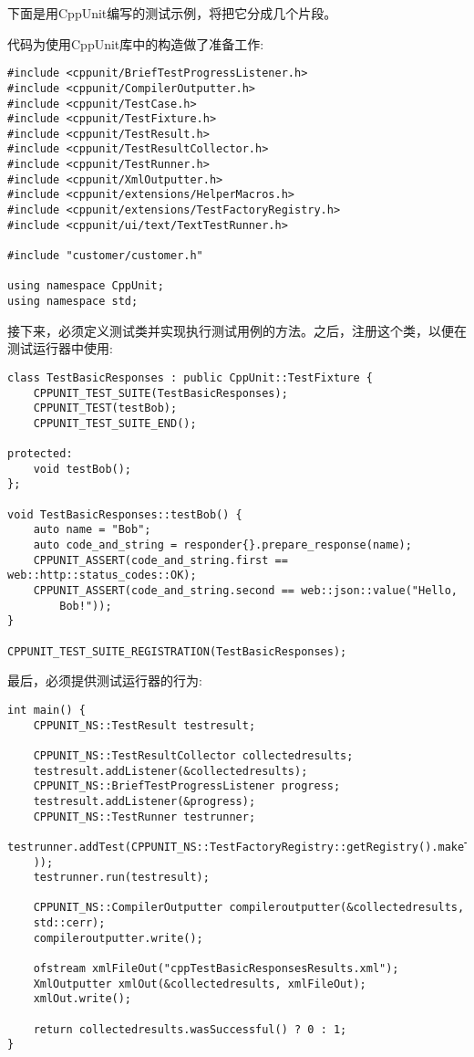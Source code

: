 下面是用CppUnit编写的测试示例，将把它分成几个片段。

代码为使用CppUnit库中的构造做了准备工作:

\begin{lstlisting}[style=styleCXX]
#include <cppunit/BriefTestProgressListener.h>
#include <cppunit/CompilerOutputter.h>
#include <cppunit/TestCase.h>
#include <cppunit/TestFixture.h>
#include <cppunit/TestResult.h>
#include <cppunit/TestResultCollector.h>
#include <cppunit/TestRunner.h>
#include <cppunit/XmlOutputter.h>
#include <cppunit/extensions/HelperMacros.h>
#include <cppunit/extensions/TestFactoryRegistry.h>
#include <cppunit/ui/text/TextTestRunner.h>

#include "customer/customer.h"

using namespace CppUnit;
using namespace std;
\end{lstlisting}

接下来，必须定义测试类并实现执行测试用例的方法。之后，注册这个类，以便在测试运行器中使用:

\begin{lstlisting}[style=styleCXX]
class TestBasicResponses : public CppUnit::TestFixture {
	CPPUNIT_TEST_SUITE(TestBasicResponses);
	CPPUNIT_TEST(testBob);
	CPPUNIT_TEST_SUITE_END();
	
protected:
	void testBob();
};

void TestBasicResponses::testBob() {
	auto name = "Bob";
	auto code_and_string = responder{}.prepare_response(name);
	CPPUNIT_ASSERT(code_and_string.first == web::http::status_codes::OK);
	CPPUNIT_ASSERT(code_and_string.second == web::json::value("Hello,
		Bob!"));
}

CPPUNIT_TEST_SUITE_REGISTRATION(TestBasicResponses);
\end{lstlisting}

最后，必须提供测试运行器的行为:

\begin{lstlisting}[style=styleCXX]
int main() {
	CPPUNIT_NS::TestResult testresult;
	
	CPPUNIT_NS::TestResultCollector collectedresults;
	testresult.addListener(&collectedresults);
	CPPUNIT_NS::BriefTestProgressListener progress;
	testresult.addListener(&progress);
	CPPUNIT_NS::TestRunner testrunner;
	testrunner.addTest(CPPUNIT_NS::TestFactoryRegistry::getRegistry().makeTest(
	));
	testrunner.run(testresult);
	
	CPPUNIT_NS::CompilerOutputter compileroutputter(&collectedresults,
	std::cerr);
	compileroutputter.write();
	
	ofstream xmlFileOut("cppTestBasicResponsesResults.xml");
	XmlOutputter xmlOut(&collectedresults, xmlFileOut);
	xmlOut.write();
	
	return collectedresults.wasSuccessful() ? 0 : 1;
}
\end{lstlisting}

